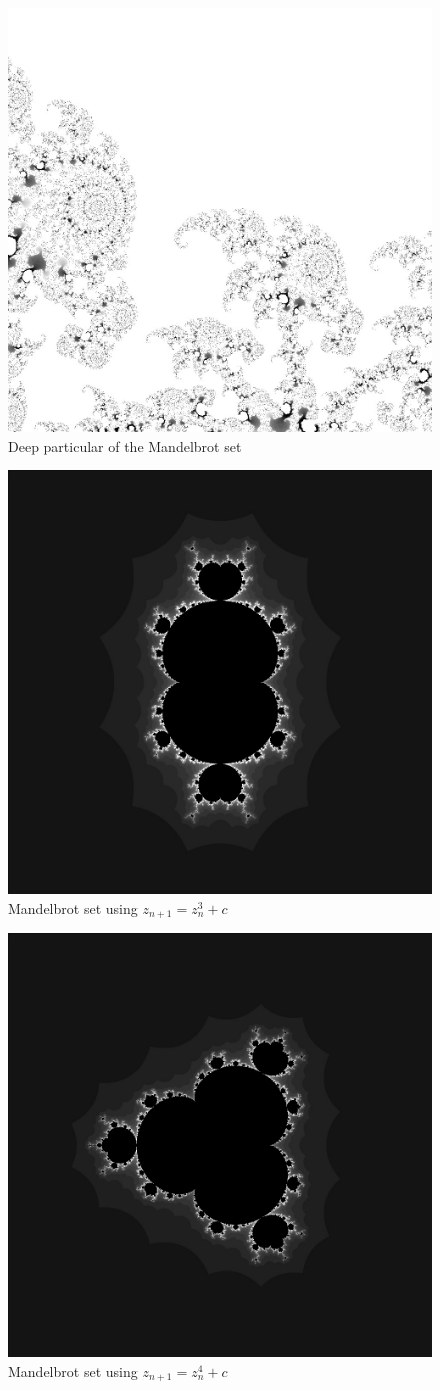 \documentclass{article}
\begin{document}
\begin{figure}[H] %
	\centering
	\includegraphics[width=0.5\columnwidth]{images/mandelbrot_image_peculiar_17} %
	\caption{Deep particular of the Mandelbrot set}
\end{figure}




\begin{figure}[H] %
	\centering
	\includegraphics[width=0.5\columnwidth]{images/custom_mandelbrot_image_cubic_peculiar_9} %
	\caption{Mandelbrot set using $z_{n+1} = z^{3}_n + c$}
\end{figure}

\begin{figure}[H] %
	\centering
	\includegraphics[width=0.5\columnwidth]{images/custom_mandelbrot_image_cubic_tetrahedric_10} %
	\caption{Mandelbrot set using $z_{n+1} = z^{4}_n + c$}
\end{figure}
\end{document}
